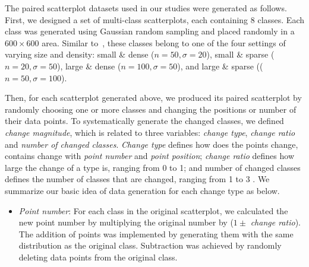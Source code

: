 {\vspace{.3em}
The paired scatterplot datasets used in our studies were generated as follows.
First, we designed a set of multi-class scatterplots, each containing $8$ classes. Each class was generated using Gaussian random sampling and placed randomly in a $600 \times 600$ area.
Similar to~\cite{Lu21}, these classes belong to one of the four settings of varying size and density: small \& dense ($n=50, \sigma=20$), small \& sparse ($n=20, \sigma=50$),  large \& dense ($n=100, \sigma=50$), and large \& sparse (($n=50, \sigma=100$).

Then, for each scatterplot generated above, we produced its paired scatterplot by randomly choosing one or more classes and changing the positions or number of their data points.
To systematically generate the changed classes, we defined \emph{change magnitude}, which is related to three variables: \emph{change type}, \emph{change ratio} and \emph{number of changed classes}.
\emph{Change type} defines how does the points change, contains change with \emph{point number} and \emph{point position};
\emph{change ratio} defines how large the change of a type is, ranging from 0 to 1; and {number of changed classes} defines the number of classes that are changed, ranging from 1 to 3
. We summarize our basic idea of data generation for each change type as below.
\begin{itemize}

     \item \emph{Point number}: For each class in the original scatterplot,  we calculated the new point number by multiplying the original number by ($1 \pm$ \emph{change ratio}). The addition of points was implemented by generating them with the same distribution as the original class. Subtraction was achieved by randomly deleting data points from the original class.


\end{itemize}}
